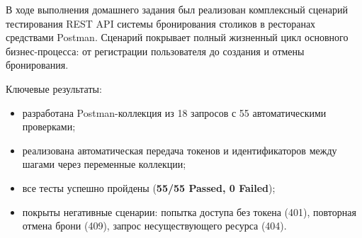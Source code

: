 \documentclass[a4paper,14pt]{extarticle}
\begin{document}
В ходе выполнения домашнего задания был реализован комплексный сценарий тестирования
REST API системы бронирования столиков в ресторанах средствами Postman. Сценарий
покрывает полный жизненный цикл основного бизнес-процесса: от регистрации пользователя
до создания и отмены бронирования.

Ключевые результаты:
\begin{itemize}[leftmargin=2cm]
  \item разработана Postman-коллекция из 18 запросов с 55 автоматическими проверками;
  \item реализована автоматическая передача токенов и идентификаторов между шагами
        через переменные коллекции;
  \item все тесты успешно пройдены (\textbf{55/55 Passed, 0 Failed});
  \item покрыты негативные сценарии: попытка доступа без токена (401),
        повторная отмена брони (409), запрос несуществующего ресурса (404).
\end{itemize}
\end{document}
